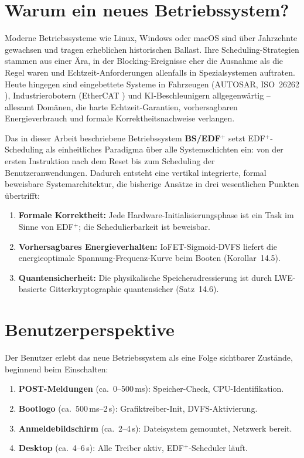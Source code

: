 ﻿\documentclass[a4paper,12pt]{scrreprt}
\theoremstyle{definition}
\begin{document}
	\section{Warum ein neues Betriebssystem?}
	
	Moderne Betriebssysteme wie Linux, Windows oder macOS sind über Jahrzehnte
	gewachsen und tragen erheblichen historischen Ballast. Ihre Scheduling-Strategien
	stammen aus einer Ära, in der Blocking-Ereignisse eher die Ausnahme als die Regel
	waren und Echtzeit-Anforderungen allenfalls in Spezialsystemen auftraten. Heute
	hingegen sind eingebettete Systeme in Fahrzeugen (AUTOSAR, ISO~26262 \cite{ISO26262}),
	Industrierobotern (EtherCAT \cite{IEC61158}) und KI-Beschleunigern allgegenwärtig --
	allesamt Domänen, die harte Echtzeit-Garantien, vorhersagbaren Energieverbrauch
	und formale Korrektheitsnachweise verlangen.
	
	Das in dieser Arbeit beschriebene Betriebssystem \textbf{BS/EDF$^+$} setzt
	EDF$^+$-Scheduling \cite{Epp2026edfplus} als einheitliches Paradigma über alle
	Systemschichten ein: von der ersten Instruktion nach dem Reset bis zum Scheduling
	der Benutzeranwendungen. Dadurch entsteht eine vertikal integrierte,
	formal beweisbare Systemarchitektur, die bisherige Ansätze in drei wesentlichen
	Punkten übertrifft:
	
	\begin{enumerate}
		\item \textbf{Formale Korrektheit:} Jede Hardware-Initialisierungsphase ist
		ein Task im Sinne von EDF$^+$; die Schedulierbarkeit ist beweisbar.
		\item \textbf{Vorhersagbares Energieverhalten:} IoFET-Sigmoid-DVFS liefert
		die energieoptimale Spannung-Frequenz-Kurve beim Booten (Korollar~14.5).
		\item \textbf{Quantensicherheit:} Die physikalische Speicheradressierung
		ist durch LWE-basierte Gitterkryptographie quantensicher (Satz~14.6).
	\end{enumerate}
	
	\section{Benutzerperspektive}
	
	Der Benutzer erlebt das neue Betriebssystem als eine Folge sichtbarer
	Zustände, beginnend beim Einschalten:
	
	\begin{enumerate}
		\item \textbf{POST-Meldungen} (ca.\ 0--500\,ms): Speicher-Check, CPU-Identifikation.
		\item \textbf{Bootlogo} (ca.\ 500\,ms--2\,s): Grafiktreiber-Init, DVFS-Aktivierung.
		\item \textbf{Anmeldebildschirm} (ca.\ 2--4\,s): Dateisystem gemountet, Netzwerk bereit.
		\item \textbf{Desktop} (ca.\ 4--6\,s): Alle Treiber aktiv, EDF$^+$-Scheduler läuft.
	\end{enumerate}
	
\end{document}
